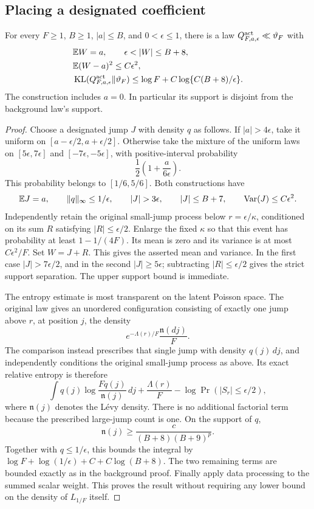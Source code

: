 \subsection{Placing a designated coefficient}
\begin{lemma}
\label{lem:levy-designated}
For every $F\ge1$, $B\ge1$, $|a|\le B$, and $0<\epsilon\le1$, there is a law $Q_{F,a,\epsilon}^{\rm act}\ll\vartheta_F$ with
\begin{align*}
 &\E W=a,\qquad \epsilon<|W|\le B+8,\\
 &\E(W-a)^2\le C\epsilon^2,\\
 &\KL(Q_{F,a,\epsilon}^{\rm act}\|\vartheta_F)
       \le\log F+C\log\{C(B+8)/\epsilon\}.
\end{align*}
The construction includes $a=0$. In particular its support is disjoint from the background law's support.
\end{lemma}
\begin{proof}
Choose a designated jump $J$ with density $q$ as follows. If $|a|>4\epsilon$, take it uniform on $[a-\epsilon/2,a+\epsilon/2]$. Otherwise take the mixture of the uniform laws on $[5\epsilon,7\epsilon]$ and $[-7\epsilon,-5\epsilon]$, with positive-interval probability
\[
 \frac12\left(1+\frac a{6\epsilon}\right).
\]
This probability belongs to $[1/6,5/6]$. Both constructions have
\[
 \E J=a,\qquad \|q\|_\infty\le1/\epsilon,
 \qquad |J|>3\epsilon,\qquad |J|\le B+7,
 \qquad \operatorname{Var}(J)\le C\epsilon^2.
\]
Independently retain the original small-jump process below $r=\epsilon/\kappa$, conditioned on its sum $R$ satisfying $|R|\le\epsilon/2$. Enlarge the fixed $\kappa$ so that this event has probability at least $1-1/(4F)$. Its mean is zero and its variance is at most $C\epsilon^2/F$. Set $W=J+R$. This gives the asserted mean and variance. In the first case $|J|>7\epsilon/2$, and in the second $|J|\ge5\epsilon$; subtracting $|R|\le\epsilon/2$ gives the strict support separation. The upper support bound is immediate.

The entropy estimate is most transparent on the latent Poisson space. The original law gives an unordered configuration consisting of exactly one jump above $r$, at position $j$, the density
\[
 e^{-\Lambda(r)/F}\frac{\mathfrak n(dj)}F.
\]
The comparison instead prescribes that single jump with density $q(j)\,dj$, and independently conditions the original small-jump process as above. Its exact relative entropy is therefore
\begin{equation}
 \int q(j)\log\frac{Fq(j)}{\mathfrak n(j)}\,dj
       +\frac{\Lambda(r)}F
       -\log\Pr(|S_r|\le\epsilon/2),
 \label{eq:levy-latent-active-entropy}
\end{equation}
where $\mathfrak n(j)$ denotes the L\'evy density. There is no additional factorial term because the prescribed large-jump count is one. On the support of $q$,
\[
 \mathfrak n(j)\ge\frac c{(B+8)(B+9)^p}.
\]
Together with $q\le1/\epsilon$, this bounds the integral by
$\log F+\log(1/\epsilon)+C+C\log(B+8)$.
The two remaining terms are bounded exactly as in the background proof. Finally apply data processing to the summed scalar weight. This proves the result without requiring any lower bound on the density of $L_{1/F}$ itself.
\end{proof}

